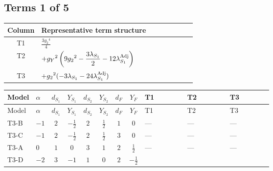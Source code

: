 \documentclass[8pt]{article}
\begin{document}
\begin{landscape}
\subsection*{Terms 1 of 5}
\begin{center}
\begin{tabular}{@{}c >{\raggedright\arraybackslash}p{0.82\linewidth}@{}}
\toprule
Column & Representative term structure \\
\midrule
T1 & \(\displaystyle \frac{3 {g_2}^4}{4}\) \\
\midrule
T2 & \(\displaystyle +{g_Y}^2 \left(9 {g_2}^2-\frac{3 {\lambda_{S_1}}}{2}-12 {\lambda_{S_1}^{\rm Adj}}\right)\) \\
\midrule
T3 & \(\displaystyle +{g_2}^2 (-3 {\lambda_{S_1}}-24 {\lambda_{S_1}^{\rm Adj}})\) \\
\midrule
\bottomrule
\end{tabular}
\end{center}
\smallskip
\tiny
\begin{longtable}{@{}llcccccc >{\raggedright\arraybackslash}p{0.21\linewidth} >{\raggedright\arraybackslash}p{0.21\linewidth} >{\raggedright\arraybackslash}p{0.21\linewidth}@{}}
\toprule
Model & $\alpha$ & $d_{S_1}$ & $Y_{S_1}$ & $d_{S_2}$ & $Y_{S_2}$ & $d_F$ & $Y_F$ & T1 & T2 & T3 \\
\midrule
\endfirsthead
\toprule
Model & $\alpha$ & $d_{S_1}$ & $Y_{S_1}$ & $d_{S_2}$ & $Y_{S_2}$ & $d_F$ & $Y_F$ & T1 & T2 & T3 \\
\midrule
\endhead
T3-B & $-1$ & $2$ & $-\frac{1}{2}$ & $2$ & $\frac{1}{2}$ & $1$ & $0$ & --- & --- & --- \\
\midrule
T3-C & $-1$ & $2$ & $-\frac{1}{2}$ & $2$ & $\frac{1}{2}$ & $3$ & $0$ & --- & --- & --- \\
\midrule
T3-A & $0$ & $1$ & $0$ & $3$ & $1$ & $2$ & $\frac{1}{2}$ & --- & --- & --- \\
\midrule
T3-D & $-2$ & $3$ & $-1$ & $1$ & $0$ & $2$ & $-\frac{1}{2}$ & \scriptsize\adjustbox{max width=\linewidth}{$\begin{gathered} \frac{3 {g_2}^4}{4}\end{gathered}$} & \scriptsize\adjustbox{max width=\linewidth}{$\begin{gathered} +{g_Y}^2 \left(9 {g_2}^2-\frac{3 {\lambda_{S_1}}}{2}-12 {\lambda_{S_1}^{\rm Adj}}\right)\end{gathered}$} & \scriptsize\adjustbox{max width=\linewidth}{$\begin{gathered} +{g_2}^2 (-3 {\lambda_{S_1}}-24 {\lambda_{S_1}^{\rm Adj}})\end{gathered}$} \\

\end{longtable}
\end{landscape}
\end{document}
